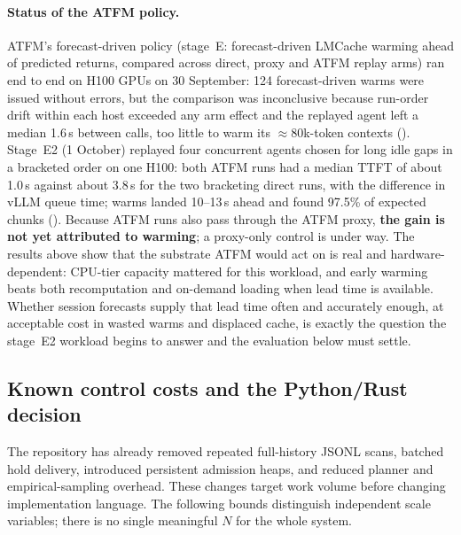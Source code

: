 \paragraph{Status of the ATFM policy.}
ATFM's forecast-driven policy (stage~E: forecast-driven LMCache warming ahead of
predicted returns, compared across direct, proxy and ATFM replay arms) ran end to end on
H100 GPUs on 30 September: 124 forecast-driven warms were issued without errors,
but the comparison was inconclusive because run-order drift within each host
exceeded any arm effect and the replayed agent left a median 1.6\,s between calls,
too little to warm its $\approx$80k-token contexts
(). Stage~E2 (1 October) replayed four
concurrent agents chosen for long idle gaps in a bracketed order on one H100: both
ATFM runs had a median TTFT of about 1.0\,s against about 3.8\,s for the two
bracketing direct runs, with the difference in vLLM queue time; warms landed
10--13\,s ahead and found 97.5\% of expected chunks
(). Because ATFM runs also pass through
the ATFM proxy, \textbf{the gain is not yet attributed to warming}; a proxy-only
control is under way. The results above show that the substrate ATFM would act on is
real and hardware-dependent: CPU-tier capacity mattered for this workload, and
early warming beats both recomputation and on-demand loading when lead time is
available. Whether session forecasts supply that lead time often and accurately
enough, at acceptable cost in wasted warms and displaced cache, is exactly the
question the stage~E2 workload begins to answer and the evaluation below must
settle.

\subsection{Known control costs and the Python/Rust decision}
The repository has already removed repeated full-history JSONL scans, batched
hold delivery, introduced persistent admission heaps, and reduced planner and
empirical-sampling overhead. These changes target work volume before changing
implementation language. The following bounds distinguish independent scale
variables; there is no single meaningful $N$ for the whole system.

